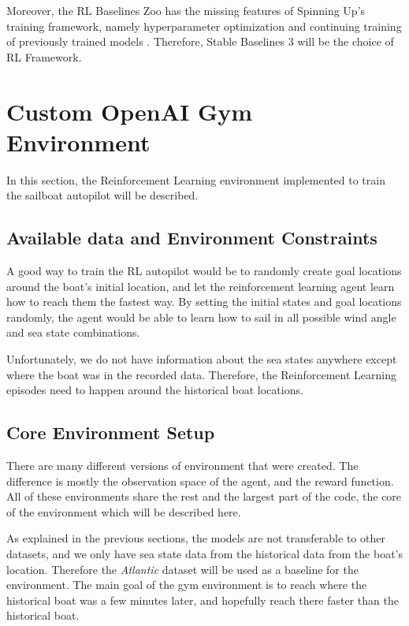 \documentclass[12pt,twoside]{report}
\begin{document}
Moreover, the RL Baselines Zoo has the missing features of Spinning Up's training framework, namely hyperparameter optimization and continuing training of previously trained models \cite{rl-zoo3}. Therefore, Stable Baselines 3 will be the choice of RL Framework.

\section{Custom OpenAI Gym Environment} \label{sec:gym-environment}
In this section, the Reinforcement Learning environment implemented to train the sailboat autopilot will be described.

\subsection{Available data and Environment Constraints}
A good way to train the RL autopilot would be to randomly create goal locations around the boat's initial location, and let the reinforcement learning agent learn how to reach them the fastest way. By setting the initial states and goal locations randomly, the agent would be able to learn how to sail in all possible wind angle and sea state combinations.

Unfortunately, we do not have information about the sea states anywhere except where the boat was in the recorded data. Therefore, the Reinforcement Learning episodes need to happen around the historical boat locations.

\subsection{Core Environment Setup}
There are many different versions of environment that were created. The difference is mostly the observation space of the agent, and the reward function. All of these environments share the rest and the largest part of the code, the core of the environment which will be described here.

As explained in the previous sections, the models are not transferable to other datasets, and we only have sea state data from the historical data from the boat's location. Therefore the \textit{Atlantic} dataset will be used as a baseline for the environment. The main goal of the gym environment is to reach where the historical boat was a few minutes later, and hopefully reach there faster than the historical boat.
\end{document}
